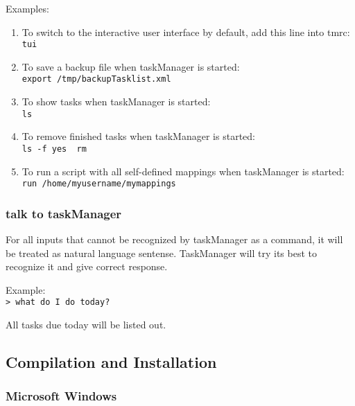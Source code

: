 \documentclass[12pt, a4paper]{article}
\begin{document}
Examples:
\begin{enumerate}
\item To switch to the interactive user interface by default, add this line into tmrc:\\
  \texttt{tui}

\item To save a backup file when taskManager is started:\\
  \texttt{export /tmp/backupTasklist.xml}

\item To show tasks when taskManager is started:\\
  \texttt{ls}

\item To remove finished tasks when taskManager is started:\\
  \texttt{ls -f yes \textbar \  rm}

\item To run a script with all self-defined mappings when taskManager is started:\\
  \texttt{run /home/myusername/mymappings}
\end{enumerate}

\subsubsection{talk to taskManager}

For all inputs that cannot be recognized by taskManager as a command, it will be treated as natural language sentense. 
TaskManager will try its best to recognize it and give correct response.

Example:\\
\texttt{\textgreater \ what do I do today?}

All tasks due today will be listed out.    

\subsection{Compilation and Installation}
\subsubsection{Microsoft Windows}
\end{document}
